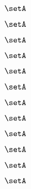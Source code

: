 {\begin{forslides}
        \begin{equation}
            \label{eq:slides-translation-119}
            \setA
        \end{equation}

        \begin{equation}
            \label{eq:slides-translation-120}
            \setA
        \end{equation}

        \begin{equation}
            \label{eq:slides-translation-121}
            \setA
        \end{equation}

        \begin{equation}
            \label{eq:slides-translation-122}
            \setA
        \end{equation}

        \begin{equation}
            \label{eq:slides-translation-123}
            \setA
        \end{equation}

        \begin{equation}
            \label{eq:slides-translation-124}
            \setA
        \end{equation}

        \begin{equation}
            \label{eq:slides-translation-125}
            \setA
        \end{equation}

        \begin{equation}
            \label{eq:slides-translation-126}
            \setA
        \end{equation}

        \begin{equation}
            \label{eq:slides-translation-127}
            \setA
        \end{equation}

        \begin{equation}
            \label{eq:slides-translation-128}
            \setA
        \end{equation}

        \begin{equation}
            \label{eq:slides-translation-129}
            \setA
        \end{equation}

        \begin{equation}
            \label{eq:slides-translation-130}
            \setA
        \end{equation}


\end{forslides}}
